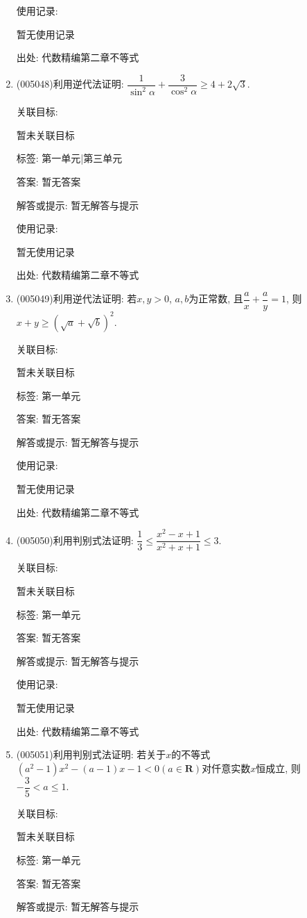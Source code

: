 \documentclass[10pt,a4paper]{article}
\begin{document}
\begin{enumerate}[1.]
使用记录:

暂无使用记录


出处: 代数精编第二章不等式
\item { (005048)}利用逆代法证明: $\dfrac 1{\sin ^2\alpha}+\dfrac 3{\cos^2\alpha}\ge 4+2\sqrt 3$.


关联目标:

暂未关联目标



标签: 第一单元|第三单元

答案: 暂无答案

解答或提示: 暂无解答与提示

使用记录:

暂无使用记录


出处: 代数精编第二章不等式
\item { (005049)}利用逆代法证明: 若$x,y>0$, $a,b$为正常数, 且$\dfrac ax+\dfrac ay=1$, 则$x+y\ge (\sqrt a+\sqrt b)^2$.


关联目标:

暂未关联目标



标签: 第一单元

答案: 暂无答案

解答或提示: 暂无解答与提示

使用记录:

暂无使用记录


出处: 代数精编第二章不等式
\item { (005050)}利用判别式法证明: $\dfrac 13\le \dfrac{x^2-x+1}{x^2+x+1}\le 3$.


关联目标:

暂未关联目标



标签: 第一单元

答案: 暂无答案

解答或提示: 暂无解答与提示

使用记录:

暂无使用记录


出处: 代数精编第二章不等式
\item { (005051)}利用判别式法证明: 若关于$x$的不等式$(a^2-1)x^2-(a-1)x-1<0(a\in \mathbf{R})$对仟意实数$x$恒成立, 则$-\dfrac 35<a\le 1$.


关联目标:

暂未关联目标



标签: 第一单元

答案: 暂无答案

解答或提示: 暂无解答与提示


\end{enumerate}
\end{document}
